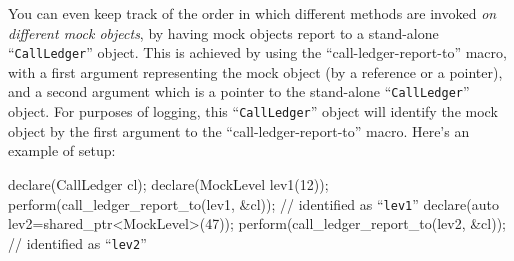\documentclass[twoside, a4paper, article]{memoir}
\begin{document}
You can even keep track of the order in which different methods are invoked
\emph{on different mock objects}, by having mock objects report to a
stand-alone ``\texttt{CallLedger}'' object.  This is achieved by using the
``call-ledger-report-to'' macro, with a first argument representing the mock
object (by a reference or a pointer), and a second argument which is a pointer
to the stand-alone ``\texttt{CallLedger}'' object.  For purposes of logging,
this ``\texttt{CallLedger}'' object will identify the mock object by the first
argument to the ``call-ledger-report-to'' macro.  Here's an example of setup:
\begin{cpplisting}
declare(CallLedger cl);
declare(MockLevel lev1(12));
perform(call_ledger_report_to(lev1, &cl)); // identified as ``\texttt{lev1}''
declare(auto lev2=shared_ptr<MockLevel>(47));
perform(call_ledger_report_to(lev2, &cl)); // identified as ``\texttt{lev2}''
\end{cpplisting}
\end{document}
